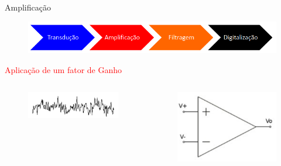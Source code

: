 \documentclass[aspectratio=169,
				xcolor=table]{beamer}
\begin{document}
	\begin{frame}{Amplificação}
		
		\begin{figure}[hbtp]
			\centering
			\includegraphics[width=\textwidth, keepaspectratio]{../figs/cap01/sistema01.png}
		\end{figure}	
		
		\textcolor{red}{Aplicação de um fator de Ganho}
		
		\vspace{-3em}
		\begin{columns}
			\begin{column}{0.25\textwidth}
				\begin{figure}[hbtp]
					\centering
					\includegraphics[width=\textwidth, keepaspectratio]{../figs/cap01/sinalori.png}
				\end{figure}	
				
			\end{column}
			\begin{column}{0.25\textwidth}
				\begin{figure}[hbtp]
					\centering
					\includegraphics[width=\textwidth, keepaspectratio]{../figs/cap01/ampop.png}
				\end{figure}	
				

\end{column}
\end{columns}
\end{frame}
\end{document}
